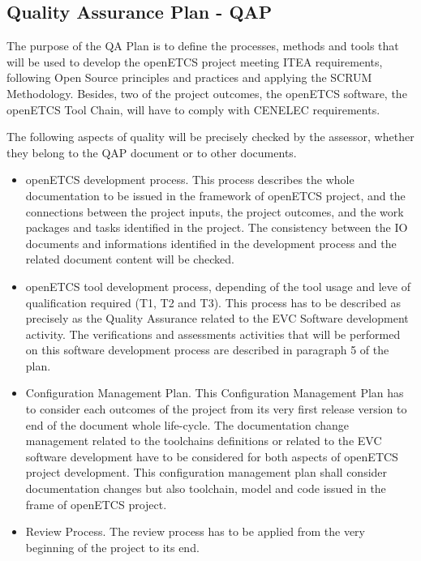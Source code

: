 \documentclass{template/openetcs_article}
\begin{document}
\subsection{Quality Assurance Plan - QAP}
The purpose of the QA Plan is to define the processes, methods and tools that will be used to develop the openETCS project meeting ITEA requirements, following
Open Source principles and practices and applying the SCRUM Methodology. Besides, two of the project outcomes, the openETCS software, the openETCS Tool Chain,
will have to comply with CENELEC requirements.

The following aspects of quality will be precisely checked by the assessor, whether they belong to the QAP document or to other documents.
\begin{itemize}
\item openETCS development process. This process describes the whole documentation to be issued in the framework of openETCS project, and the connections
between the project inputs, the project outcomes, and the work packages and tasks identified in the project. The consistency between the IO documents and
informations identified in the development process and the related document content will be checked.
\item openETCS tool development process, depending of the tool usage and leve of qualification required (T1, T2 and T3). This process has to be described as
precisely as the Quality Assurance related to the EVC Software development activity. The verifications and assessments activities that will be performed on
this software development process are described in paragraph 5 of the plan.
\item Configuration Management Plan. This Configuration Management Plan has to consider each outcomes of the project from its very first release version to end
of the document whole life-cycle. The documentation change management related to the toolchains definitions or related to the EVC software development have
to be considered for both aspects of openETCS project development. This configuration management plan shall consider documentation changes but also toolchain,
model and code issued in the frame of openETCS project.
\item Review Process. The review process has to be applied from the very beginning of the project to its end.
\end{itemize}
\end{document}
